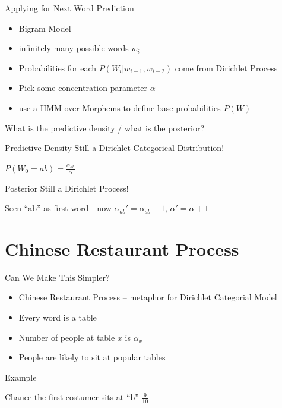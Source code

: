 \documentclass[11pt]{beamer}
\begin{document}
	\begin{frame}{Applying for Next Word Prediction}
		\begin{itemize}
			\item Bigram Model
			\item infinitely many possible words $w_i$
			\item Probabilities for each $P(W_i|w_{i-1},w_{i-2})$ come from Dirichlet Process
			\item Pick some concentration parameter $\alpha$
			\item use a HMM over Morphems to define base probabilities $P(W)$
		\end{itemize}
		
		\vspace{10pt} What is the predictive density / what is the posterior?
	\end{frame}
	
	\begin{frame}{Predictive Density}
		Still a Dirichlet Categorical Distribution!
		
		$P(W_{0}=ab) = \frac{\alpha_{ab}}{\alpha}$
	\end{frame}
	
	\begin{frame}{Posterior}
		Still a Dirichlet Process!
		
		\vspace{10pt} Seen ``ab'' as first word - now $\alpha_{ab}' = \alpha_{ab}+1$, $\alpha' = \alpha + 1$ 
	\end{frame}
	
	\section{Chinese Restaurant Process}
	
	\begin{frame}{Can We Make This Simpler?}
		\begin{itemize}
			\item Chinese Restaurant Process -- metaphor for Dirichlet Categorial Model
			\item Every word is a table
			\item Number of people at table $x$ is $\alpha_x$
			\item People are likely to sit at popular tables
		\end{itemize}
	\end{frame}
	
	\begin{frame}{Example}
		\centering
		
		\vspace{10pt} Chance the first costumer sits at ``b'' $\frac{9}{10}$
	\end{frame}
	
\end{document}
